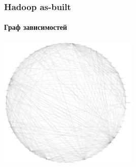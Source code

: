 \documentclass[xetex,mathserif,serif]{beamer}
\begin{document}
	\begin{frame}
		\frametitle{Hadoop as-built}
		\framesubtitle{Граф зависимостей}
		\begin{center}
			\includegraphics[width=0.5\textwidth]{hadoopDependencies.png}
		\end{center}
	\end{frame}
\end{document}
